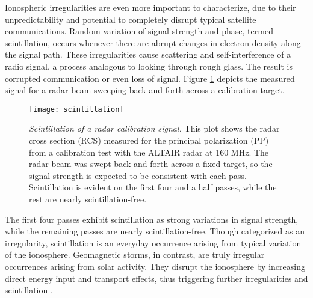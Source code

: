 Ionospheric irregularities are even more important to characterize, due to their unpredictability and potential to completely disrupt typical satellite communications. Random variation of signal strength and phase, termed scintillation, occurs whenever there are abrupt changes in electron density along the signal path. These irregularities cause scattering and self-interference of a radio signal, a process analogous to looking through rough glass. The result is corrupted communication or even loss of signal. Figure \ref{fig:scintillation} depicts the measured signal for a radar beam sweeping back and forth across a calibration target.
\begin{figure}[tpb]
 \centering
 \texttt{[image: scintillation]}
 \caption[Scintillation of a radar calibration signal]{\emph{Scintillation of a radar calibration signal.} This plot shows the radar cross section (RCS) measured for the principal polarization (PP) from a calibration test with the ALTAIR radar at 160 MHz. The radar beam was swept back and forth across a fixed target, so the signal strength is expected to be consistent with each pass. Scintillation is evident on the first four and a half passes, while the rest are nearly scintillation-free.}
 \label{fig:scintillation}
\end{figure}%
The first four passes exhibit scintillation as strong variations in signal strength, while the remaining passes are nearly scintillation-free. Though categorized as an irregularity, scintillation is an everyday occurrence arising from typical variation of the ionosphere. Geomagnetic storms, in contrast, are truly irregular occurrences arising from solar activity. They disrupt the ionosphere by increasing direct energy input and transport effects, thus triggering further irregularities and scintillation \autocite{Kel09}.

